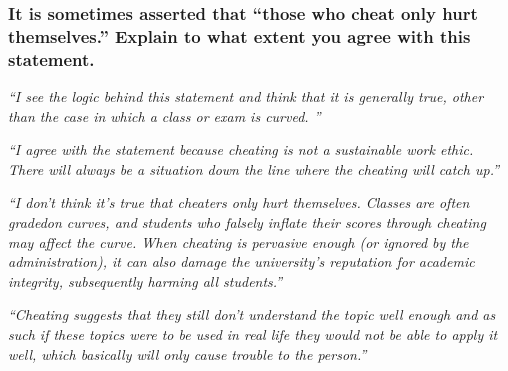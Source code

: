 \documentclass[12pt]{beamer}
\newcommand\ans[1]{{\it ``#1''}}
\newcommand\gap{\vspace{5mm}}
\begin{document}
\begin{frame}   %
\frametitle{It is sometimes asserted that ``those who cheat only hurt themselves.'' Explain to what extent you agree with this statement.}

\ans{I see the logic behind this statement and think that it is generally true, other than the case in which a class or exam is curved. }

\gap

\ans{I agree with the statement because cheating is not a sustainable work ethic.  There will always be a situation down the line where the cheating will catch up.}

\ans{I don’t think it’s true that cheaters only hurt themselves.  Classes are often gradedon  curves,  and  students  who  falsely  inflate  their  scores  through  cheating may affect the curve.  When cheating is pervasive enough (or ignored by the administration), it can also damage the university’s reputation for academic integrity, subsequently harming all students.}

\ans{Cheating suggests that they still don't understand the topic well enough and as such if these topics were to be used in real life they would not be able to apply it well, which basically will only cause trouble to the person.}




\end{frame}

\begin{frame}

\end{frame}
\end{document}

